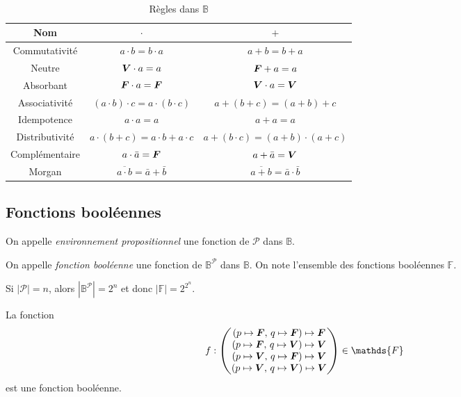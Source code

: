 \begin{rmk}~

	\begin{table}[H]
		\centering
		\begin{tabular}{c|c|c}
			{\sc Nom}\/&$\cdot$\/&$+$\/\\ \hline
			Commutativité&$a\cdot b = b\cdot a$\/ &$a+b=b+a$\/ \\
			Neutre&${\bm{V}}\/ \cdot a = a$\/ & ${\bm{F}}\/ + a = a$\/ \\
			Absorbant&${\bm{F}}\/ \cdot a = {\bm{F}}\/$\/&${\bm{V}}\/ \cdot a = {\bm{V}}\/$ \\
			Associativité&$(a\cdot b)\cdot c = a\cdot (b\cdot c)$\/ &$a+(b+c)=(a+b)+c$\/ \\
			Idempotence&$a\cdot a = a$\/ & $a + a = a$\/ \\
			Distributivité&$a\cdot (b+c) = a\cdot b + a\cdot c$\/ & $a + (b\cdot c) = (a+b)\cdot (a+c)$\/ \\
			Complémentaire&$a\cdot \bar{a} = {\bm{F}}\/$\/&$a+\bar{a} = {\bm{V}}\/ $\/ \\
			{\sc Morgan}\/&$\overline{a\cdot b} = \bar{a}+ \bar{b}$\/&$\overline{a+b} = \bar{a}\cdot \bar{b}$\/
		\end{tabular}
		\caption{Règles dans $\mathds{B}$}
	\end{table}
\end{rmk}

\subsection{Fonctions booléennes}

\begin{defn}
	On appelle {\it environnement propositionnel}\/ une fonction de $\mathcal{P}$\/ dans $\mathds{B}$.
\end{defn}

\begin{defn}
	On appelle {\it fonction booléenne}\/ une fonction de $\mathds{B}^{\mathcal{P}}$\/ dans $\mathds{B}$. On note l'ensemble des fonctions booléennes $\mathds{F}$.
\end{defn}

\begin{rmk}
	Si $|\mathcal{P}| = n$, alors $\left| \mathds{B}^{\mathcal{P}} \right| = 2^n$\/ et donc $|\mathds{F}| = 2^{2^n}$.
\end{rmk}

\begin{exm}
	La fonction \[
		f : \begin{pmatrix}
			(p\mapsto {\bfm F},\,q \mapsto {\bfm F}\/)\mapsto {\bfm F}\/\\
			(p\mapsto {\bfm F},\,q \mapsto {\bfm V}\/)\mapsto {\bfm V}\/\\
			(p\mapsto {\bfm V},\,q \mapsto {\bfm F}\/)\mapsto {\bfm V}\/\\
			(p\mapsto {\bfm V},\,q \mapsto {\bfm V}\/)\mapsto {\bfm V}\/\\
		\end{pmatrix} \in \mathds{F}
	\] est une fonction booléenne.
\end{exm}

